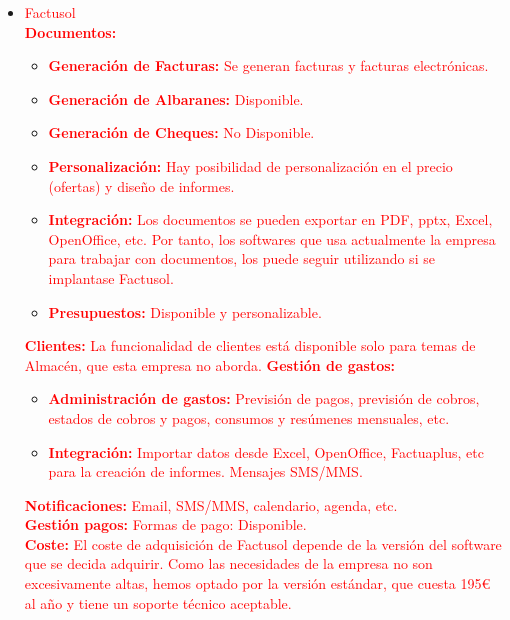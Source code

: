 \documentclass{article}
\begin{document}
\begin{itemize}
\begin{itemize}
\item \textcolor{Red}{Factusol\\}
\textcolor{Red}{\textbf{Documentos:}}
\begin{itemize}
\item \textcolor{Red}{\textbf{Generación de Facturas:} Se generan facturas y facturas electrónicas.}
\item \textcolor{Red}{\textbf{Generación de Albaranes:} Disponible.}
\item \textcolor{Red}{\textbf{Generación de Cheques:} No Disponible.} 
\item \textcolor{Red}{\textbf{Personalización:} Hay posibilidad de personalización en el precio (ofertas) y diseño de informes.}
\item \textcolor{Red}{\textbf{Integración:} Los documentos se pueden exportar en PDF, pptx, Excel, OpenOffice, etc. Por tanto, los softwares que usa actualmente la empresa para trabajar con documentos, los puede seguir utilizando si se implantase Factusol.} 
\item \textcolor{Red}{\textbf{Presupuestos:} Disponible y personalizable.}
\end{itemize}
\textcolor{Red}{\textbf{Clientes:} La funcionalidad de clientes está disponible solo para temas de Almacén, que esta empresa no aborda.}
\textcolor{Red}{\textbf{Gestión de gastos:}}
\begin{itemize}
\item \textcolor{Red}{\textbf{Administración de gastos:} Previsión de pagos, previsión de cobros, estados de cobros y pagos, consumos y resúmenes mensuales, etc.}
\item \textcolor{Red}{\textbf{Integración:} Importar datos desde Excel, OpenOffice, Factuaplus, etc para la creación de informes. Mensajes SMS/MMS.}
\end{itemize}
\textcolor{Red}{\textbf{Notificaciones:} Email, SMS/MMS, calendario, agenda, etc.\\}
\textcolor{Red}{\textbf{Gestión pagos:} Formas de pago: Disponible.\\}
\textcolor{Red}{\textbf{Coste:} El coste de adquisición de Factusol depende de la versión del software que se decida adquirir. Como las necesidades de la empresa no son excesivamente altas, hemos optado por la versión estándar, que cuesta 195€ al año y tiene un soporte técnico aceptable.}
\end{itemize}
\end{itemize}

\textcolor{Red}{}
\end{document}
